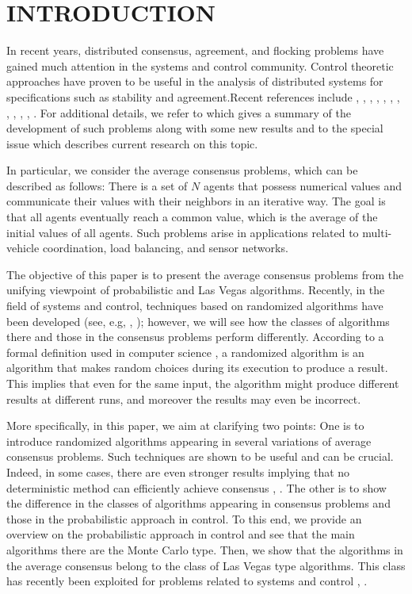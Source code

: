 \documentclass[12pt]{article}
\begin{document}
		\section{INTRODUCTION}
		In recent years, distributed consensus, agreement, and flocking problems have gained much attention in the systems and control community. Control theoretic approaches have proven to be useful in the analysis of distributed systems for specifications such as stability and agreement.Recent references include \cite{bib03}, \cite{bib04}, \cite{bib06}, \cite{bib07}, \cite{bib10}, \cite{bib12}, \cite{bib16}, \cite{bib18}, \cite{bib20}, \cite{bib21}, \cite{bib25}, \cite{bib27}.
		For additional details, we refer to \cite{bib05} which gives a summary of the development of such problems along with some new results and to the special issue \cite{bib01} which describes current research on this topic.
		\par
		In particular, we consider the average consensus problems, which can be described as follows: There is a set of $N$ agents that possess numerical values and communicate their values with their neighbors in an iterative way. The goal is that all agents eventually reach a common value, which is the average of the initial values of all agents. Such problems arise in applications related to multi-vehicle coordination, load balancing, and sensor networks. 
		\par
		The objective of this paper is to present the average consensus problems from the unifying viewpoint of probabilistic and Las Vegas algorithms. Recently, in the field of systems and control, techniques based on randomized algorithms have been developed (see, e.g, \cite{bib23}, \cite{bib26}); however, we will see how the classes of algorithms there and those in the consensus problems perform differently. According to a formal definition used in computer science \cite{bib17}, a randomized algorithm is an algorithm that makes random choices during its execution to produce a result. This implies that even for the same input, the algorithm might produce different results at different runs, and moreover the results may even be incorrect.
		\par
		More specifically, in this paper, we aim at clarifying two points: One is to introduce randomized algorithms appearing in several variations of average consensus problems. Such techniques are shown to be useful and can be crucial. Indeed, in some cases, there are even stronger results implying that no deterministic method can efficiently achieve consensus \cite{bib09}, \cite{bib17}. The other is to show the difference in the classes of algorithms appearing in consensus problems and those in the probabilistic approach in control. To this end, we provide an overview on the probabilistic approach in control and see that the main algorithms there are the Monte Carlo type. Then, we show that the algorithms in the average consensus belong to the class of Las Vegas type algorithms. This class has recently been exploited for problems related to systems and control \cite{bib11}, \cite{bib24}.
\end{document}
